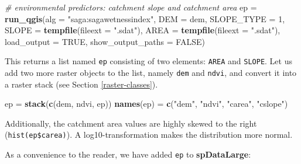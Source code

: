 \documentclass[]{krantz}
\newenvironment{Shaded}{\begin{snugshade}}{\end{snugshade}}
\newcommand{\CommentTok}[1]{\textcolor[rgb]{0.37,0.37,0.37}{\textit{#1}}}
\newcommand{\DataTypeTok}[1]{\textcolor[rgb]{0.27,0.27,0.27}{#1}}
\newcommand{\DecValTok}[1]{\textcolor[rgb]{0.06,0.06,0.06}{#1}}
\newcommand{\KeywordTok}[1]{\textcolor[rgb]{0.27,0.27,0.27}{\textbf{#1}}}
\newcommand{\NormalTok}[1]{#1}
\newcommand{\OperatorTok}[1]{\textcolor[rgb]{0.43,0.43,0.43}{\textbf{#1}}}
\newcommand{\OtherTok}[1]{\textcolor[rgb]{0.37,0.37,0.37}{#1}}
\newcommand{\StringTok}[1]{\textcolor[rgb]{0.5,0.5,0.5}{#1}}
\begin{document}
\begin{Shaded}
\begin{Highlighting}[]
\CommentTok{# environmental predictors: catchment slope and catchment area}
\NormalTok{ep =}\StringTok{ }\KeywordTok{run_qgis}\NormalTok{(}\DataTypeTok{alg =} \StringTok{"saga:sagawetnessindex"}\NormalTok{,}
              \DataTypeTok{DEM =}\NormalTok{ dem,}
              \DataTypeTok{SLOPE_TYPE =} \DecValTok{1}\NormalTok{, }
              \DataTypeTok{SLOPE =} \KeywordTok{tempfile}\NormalTok{(}\DataTypeTok{fileext =} \StringTok{".sdat"}\NormalTok{),}
              \DataTypeTok{AREA =} \KeywordTok{tempfile}\NormalTok{(}\DataTypeTok{fileext =} \StringTok{".sdat"}\NormalTok{),}
              \DataTypeTok{load_output =} \OtherTok{TRUE}\NormalTok{,}
              \DataTypeTok{show_output_paths =} \OtherTok{FALSE}\NormalTok{)}
\end{Highlighting}
\end{Shaded}

This returns a list named \texttt{ep} consisting of two elements: \texttt{AREA} and \texttt{SLOPE}.
Let us add two more raster objects to the list, namely \texttt{dem} and \texttt{ndvi}, and convert it into a raster stack (see Section \ref{raster-classes}).

\begin{Shaded}
\begin{Highlighting}[]
\NormalTok{ep =}\StringTok{ }\KeywordTok{stack}\NormalTok{(}\KeywordTok{c}\NormalTok{(dem, ndvi, ep))}
\KeywordTok{names}\NormalTok{(ep) =}\StringTok{ }\KeywordTok{c}\NormalTok{(}\StringTok{"dem"}\NormalTok{, }\StringTok{"ndvi"}\NormalTok{, }\StringTok{"carea"}\NormalTok{, }\StringTok{"cslope"}\NormalTok{)}
\end{Highlighting}
\end{Shaded}

Additionally, the catchment area values are highly skewed to the right (\texttt{hist(ep\$carea)}).
A log10-transformation makes the distribution more normal.

\begin{Shaded}
\end{Shaded}

As a convenience to the reader, we have added \texttt{ep} to \textbf{spDataLarge}:
\end{document}

